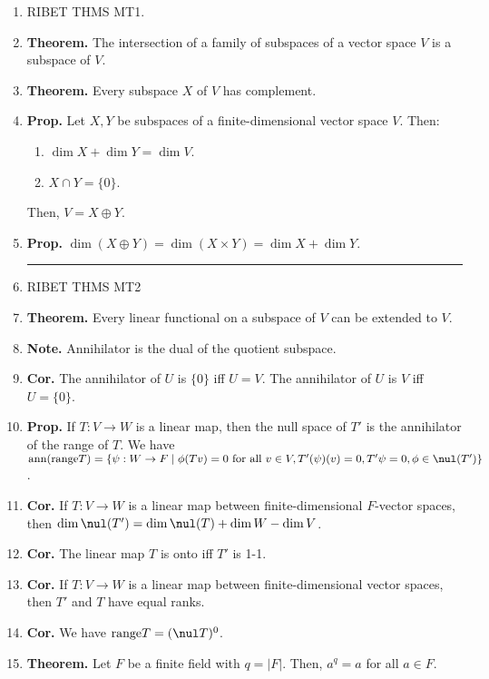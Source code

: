 \begin{enumerate}
	\begin{center}
		\hrule
	\end{center} 
	\item RIBET THMS MT1. 
    \item \textbf{Theorem. } The intersection of a family of subspaces of a vector space $V$ is a subspace of $V$. 
    \item \textbf{Theorem. } Every subspace $X$ of $V$ has complement. 
	\item \textbf{Prop. } Let $X,Y$ be subspaces of a finite-dimensional vector space $V$. Then: 
	\begin{enumerate}
		\item $\dim X + \dim Y = \dim V$. 
		\item $X \cap Y = \{0\}$. 
	\end{enumerate}
	Then, $V=X \oplus Y$. 
	\item \textbf{Prop. } $\dim(X \oplus Y) = \dim(X \times Y) = \dim X + \dim Y$. 
	\begin{center}
		\hrule
	\end{center}
	\item RIBET THMS MT2
	\item \textbf{Theorem. } Every linear functional on a subspace of $V$ can be extended to $V$. 
	\item \textbf{Note. } Annihilator is the dual of the quotient subspace. 
	\item \textbf{Cor. } The annihilator of $U$ is $\{0\}$ iff $U = V$. The annihilator of $U$ is $V$ iff $U = \{0\}$. 
	\item \textbf{Prop. } If $T: V \to W$ is a linear map, then the null space of $T'$ is the annihilator of the range of $T$. We have $\textrm{ann}(\textrm{range}T) = \{\psi: W \to F \mid \phi(Tv)=0 \textrm{ for all } v \in V, T'(\psi)(v)=0, T'\psi = 0, \phi \in \nul(T')\}$. 
	\item \textbf{Cor. } If $T: V \to W$ is a linear map between finite-dimensional $F$-vector spaces, then $\dim \nul(T') = \dim \nul(T) + \dim W - \dim V$. 
	\item \textbf{Cor. } The linear map $T$ is onto iff $T'$ is 1-1. 
	\item \textbf{Cor. } If $T: V \to W$ is a linear map between finite-dimensional vector spaces, then $T'$ and $T$ have equal ranks. 
	\item \textbf{Cor. } We have $\textrm{range}T = (\nul T)^0$. 
	\item \textbf{Theorem. } Let $F$ be a finite field with $q = |F|$. Then, $a^q=a$ for all $a \in F$. 

\end{enumerate}
